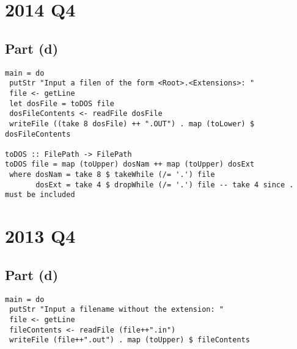\documentclass[11pt]{article}
\begin{document}
\section{2014 Q4}
\label{sec:org2c48a00}
\subsection{Part (d)}
\label{sec:org54fa0f8}
\begin{verbatim}
main = do
 putStr "Input a filen of the form <Root>.<Extensions>: "
 file <- getLine
 let dosFile = toDOS file
 dosFileContents <- readFile dosFile
 writeFile ((take 8 dosFile) ++ ".OUT") . map (toLower) $ dosFileContents

toDOS :: FilePath -> FilePath
toDOS file = map (toUpper) dosNam ++ map (toUpper) dosExt
 where dosNam = take 8 $ takeWhile (/= '.') file
       dosExt = take 4 $ dropWhile (/= '.') file -- take 4 since . must be included
\end{verbatim}
\section{2013 Q4}
\label{sec:orge1054d1}
\subsection{Part (d)}
\label{sec:orgaacfc27}
\begin{verbatim}
main = do
 putStr "Input a filename without the extension: "
 file <- getLine
 fileContents <- readFile (file++".in")
 writeFile (file++".out") . map (toUpper) $ fileContents
\end{verbatim}
\end{document}
